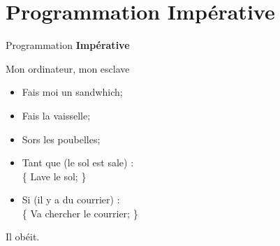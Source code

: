 \section{Programmation Impérative}

\begingroup
{}
\begin{frame}
    \begin{center}
        \vspace{1cm}
        {\Large\color{background} Programmation \textbf{Impérative}}
    \end{center}
\end{frame}
\endgroup

\begin{frame}[c]{Mon ordinateur, mon esclave}
  \begin{center}
    \begin{itemize}
      \item<+-> Fais moi un sandwhich;
      \item<+-> Fais la vaisselle;
      \item<+-> Sors les poubelles;
      \item<+-> Tant que (le sol est sale) :\\
        \{ Lave le sol; \}
      \item<+-> Si (il y a du courrier) :\\
        \{ Va chercher le courrier; \}
    \end{itemize}
    \onslide<+->
    \vspace{1cm}
    Il obéit.
  \end{center}
\end{frame}
